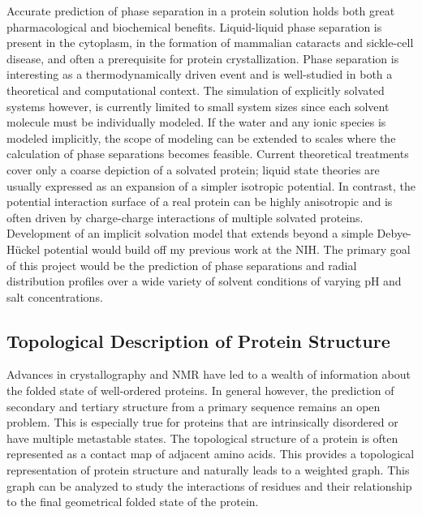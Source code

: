 \documentclass[]{scrartcl}
\newcommand{\insetpicture}[1]{\marginpar{\texttt{[image: \#1]}}}
\begin{document}
\begin{cleanCV}
Accurate prediction of phase separation in a protein solution holds both great pharmacological and biochemical benefits.
Liquid-liquid phase separation is present in the cytoplasm, in the formation of mammalian cataracts and sickle-cell disease, and often a prerequisite for protein crystallization.
Phase separation is interesting as a thermodynamically driven event and is well-studied in both a theoretical and computational context.
The simulation of explicitly solvated systems however, is currently limited to small system sizes since each solvent molecule must be individually modeled.
\insetpicture{research_images/macrocharge_lysozyme}
If the water and any ionic species is modeled implicitly, the scope of modeling can be extended to scales where the calculation of phase separations becomes feasible.
Current theoretical treatments cover only a coarse depiction of a solvated protein; liquid state theories are usually expressed as an expansion of a simpler isotropic potential.
In contrast, the potential interaction surface of a real protein can be highly anisotropic and is often driven by charge-charge interactions of multiple solvated proteins.
Development of an implicit solvation model that extends beyond a simple Debye-H\"{u}ckel potential would build off my previous work at the NIH.
The primary goal of this project would be the prediction of phase separations and radial distribution profiles over a wide variety of solvent conditions of varying pH and salt concentrations. 

\pagebreak

\subsection{Topological Description of Protein Structure}

Advances in crystallography and NMR have led to a wealth of information about the folded state of well-ordered proteins.
In general however, the prediction of secondary and tertiary structure from a primary sequence remains an open problem.
\insetpicture{research_images/3d_example_graph.png}
This is especially true for proteins that are intrinsically disordered or have multiple metastable states.
The topological structure of a protein is often represented as a contact map of adjacent amino acids.
This provides a topological representation of protein structure and naturally leads to a weighted graph.
This graph can be analyzed to study the interactions of residues and their relationship to the final geometrical folded state of the protein.


\end{cleanCV}
\end{document}
